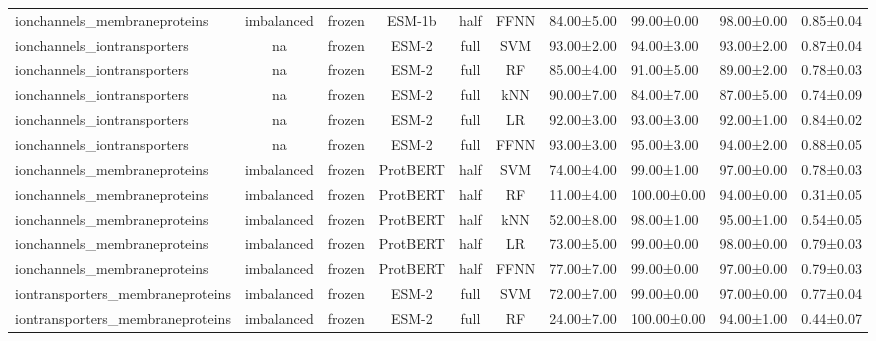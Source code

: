 \begin{tabular}{lcccccc}
    ionchannels\_membraneproteins & imbalanced &         frozen &       ESM-1b &      half &       FFNN &  84.00±5.00 &  99.00±0.00 &  98.00±0.00 & 0.85±0.04 \\
     ionchannels\_iontransporters &         na &         frozen &        ESM-2 &      full &        SVM &  93.00±2.00 &  94.00±3.00 &  93.00±2.00 & 0.87±0.04 \\
     ionchannels\_iontransporters &         na &         frozen &        ESM-2 &      full &         RF &  85.00±4.00 &  91.00±5.00 &  89.00±2.00 & 0.78±0.03 \\
     ionchannels\_iontransporters &         na &         frozen &        ESM-2 &      full &        kNN &  90.00±7.00 &  84.00±7.00 &  87.00±5.00 & 0.74±0.09 \\
     ionchannels\_iontransporters &         na &         frozen &        ESM-2 &      full &         LR &  92.00±3.00 &  93.00±3.00 &  92.00±1.00 & 0.84±0.02 \\
     ionchannels\_iontransporters &         na &         frozen &        ESM-2 &      full &       FFNN &  93.00±3.00 &  95.00±3.00 &  94.00±2.00 & 0.88±0.05 \\
    ionchannels\_membraneproteins & imbalanced &         frozen &     ProtBERT &      half &        SVM &  74.00±4.00 &  99.00±1.00 &  97.00±0.00 & 0.78±0.03 \\
    ionchannels\_membraneproteins & imbalanced &         frozen &     ProtBERT &      half &         RF &  11.00±4.00 & 100.00±0.00 &  94.00±0.00 & 0.31±0.05 \\
    ionchannels\_membraneproteins & imbalanced &         frozen &     ProtBERT &      half &        kNN &  52.00±8.00 &  98.00±1.00 &  95.00±1.00 & 0.54±0.05 \\
    ionchannels\_membraneproteins & imbalanced &         frozen &     ProtBERT &      half &         LR &  73.00±5.00 &  99.00±0.00 &  98.00±0.00 & 0.79±0.03 \\
    ionchannels\_membraneproteins & imbalanced &         frozen &     ProtBERT &      half &       FFNN &  77.00±7.00 &  99.00±0.00 &  97.00±0.00 & 0.79±0.03 \\
iontransporters\_membraneproteins & imbalanced &         frozen &        ESM-2 &      full &        SVM &  72.00±7.00 &  99.00±0.00 &  97.00±0.00 & 0.77±0.04 \\
iontransporters\_membraneproteins & imbalanced &         frozen &        ESM-2 &      full &         RF &  24.00±7.00 & 100.00±0.00 &  94.00±1.00 & 0.44±0.07 \\

\end{tabular}
